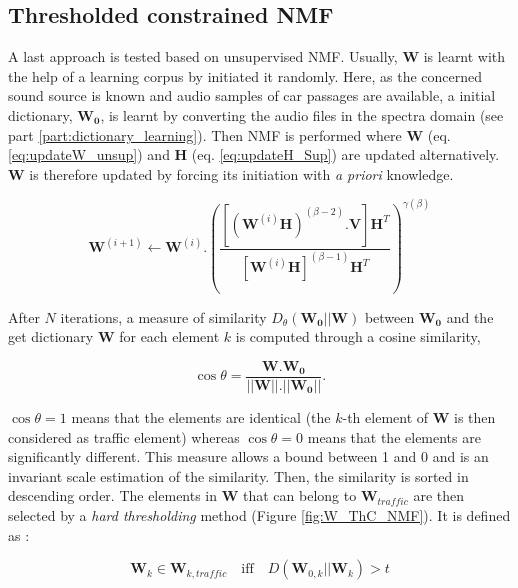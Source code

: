 \documentclass[twocolumn,a4paper,10pt]{article}
\begin{document}
\subsection{Thresholded constrained NMF}

A last approach is tested based on unsupervised NMF. Usually, $\mathbf{W}$ is learnt with the help of a learning corpus by initiated it randomly. Here, as the concerned sound source is known and audio samples of car passages are available, a initial dictionary, $\mathbf{W_0}$, is learnt by converting the audio files in the spectra domain (see part \ref{part:dictionary_learning}). Then NMF is performed where $\mathbf{W}$ (eq. \ref{eq:updateW_unsup}) and $\mathbf{H}$ (eq.  \ref{eq:updateH_Sup}) are updated alternatively. $\mathbf{W}$ is therefore updated by forcing its initiation with \textit{a priori} knowledge.

\begin{equation}\label{eq:updateW_unsup}
\textbf{W}^{(i+1)} \leftarrow \mathbf{W}^{(i)}.\left(\frac{\left[\left(\mathbf{W}^{(i)}\mathbf{H} \right)^{(\beta-2)}.\mathbf{V} \right]\mathbf{H}^T}{\left[\mathbf{W}^{(i)}\mathbf{H} \right]^{(\beta-1)}\mathbf{H}^T}\right)^{\gamma(\beta)}
\end{equation}

After $N$ iterations, a measure of similarity $D_{\theta}\left(\mathbf{W_0} \vert \vert \mathbf{W} \right)$ between $\mathbf{W_0}$ and the get dictionary $\mathbf{W}$ for each element $k$ is computed through a cosine similarity,

\begin{equation}
\cos \theta = \frac{\mathbf{W}.\mathbf{W_0}}{\vert \vert \mathbf{W}  \vert \vert . \vert \vert \mathbf{W_0} \vert \vert}.
\end{equation}

$\cos \theta = 1$ means that the elements are identical (the $k$-th element of $\mathbf{W}$ is then considered as traffic element) whereas $\cos \theta = 0$ means that the elements are significantly different. This measure allows a bound between 1 and 0 and is an invariant scale estimation of the similarity. Then, the similarity is sorted in descending order. The elements in $\mathbf{W}$ that can belong to $\mathbf{W}_{traffic}$ are then selected by a \textit{hard thresholding} method (Figure \ref{fig:W_ThC_NMF}). It is defined as :

\begin{equation}
\mathbf{W}_k \in \mathbf{W}_{k,traffic} \quad \text{iff} \quad D\left(\mathbf{W}_{0,k} \vert \vert \mathbf{W}_{k} \right) > t
\end{equation}
\end{document}

